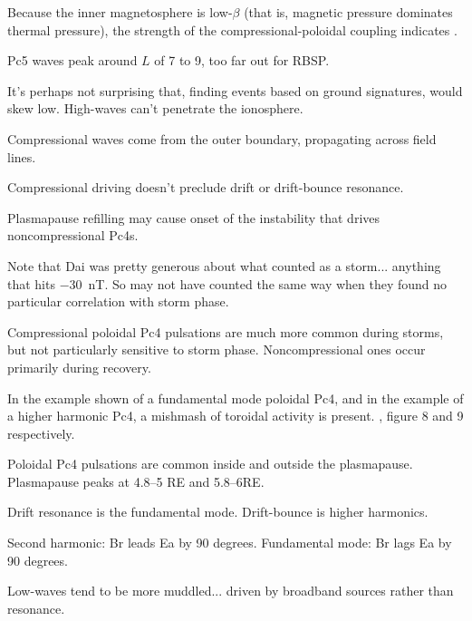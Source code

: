 Because the inner magnetosphere is low-$\beta$ (that is, magnetic pressure dominates thermal pressure), the strength of the compressional-poloidal coupling indicates \azm\cite{hughes_1994}. 



Pc5 waves peak around $L$ of 7 to 9, too far out for RBSP\cite{anderson_1990,liu_2009}. 

It's perhaps not surprising that, finding events based on ground signatures, \azm would skew low. High-\azm waves can't penetrate the ionosphere. 

Compressional waves come from the outer boundary, propagating across field lines\cite{lysak_1992}. 

Compressional driving doesn't preclude drift or drift-bounce resonance\cite{zong_2007,zong_2009}. 

Plasmapause refilling may cause onset of the instability that drives noncompressional Pc4s\cite{engebretson_1992,liu_2013}. 

Note that Dai\cite{dai_2015} was pretty generous about what counted as a storm... anything that hits \SI{-30}{\nano\tesla}. So \cite{motoba_2015} may not have counted the same way when they found no particular correlation with storm phase. 

Compressional poloidal Pc4 pulsations are much more common during storms, but not particularly sensitive to storm phase. Noncompressional ones occur primarily during recovery\cite{dai_2015,rostoker_1979,engebretson_1992,anderson_1994}. 

In the example shown of a fundamental mode poloidal Pc4, and in the example of a higher harmonic Pc4, a mishmash of toroidal activity is present. \cite{dai_2015}, figure 8 and 9 respectively. 

Poloidal Pc4 pulsations are common inside and outside the plasmapause. Plasmapause peaks at 4.8--5 RE and 5.8--6RE\cite{dai_2015}. 

Drift resonance is the fundamental mode. Drift-bounce is higher harmonics\cite{dai_2015}. 


Second harmonic: Br leads Ea by 90 degrees. Fundamental mode: Br lags Ea by 90 degrees. \cite{dai_2015}

Low-\azm waves tend to be more muddled... driven by broadband sources rather than resonance\cite{dai_2015}. 

